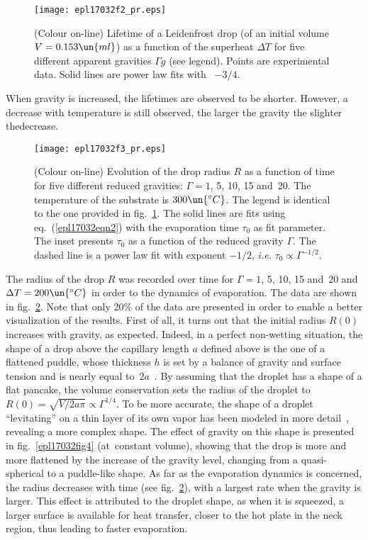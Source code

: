 \documentclass[doublecol,final]{epl2}
\begin{document}
\begin{figure}%
\centering
\texttt{[image: epl17032f2\_pr.eps]}
\caption{(Colour on-line) Lifetime of a Leidenfrost drop (of an initial volume $V=0.153\un{ml}$) as a function of the superheat $\Delta T$ for five different apparent gravities $\Gamma g$ (see legend). Points are experimental data. Solid lines are power law fits with ~$-3/4$.} \label{epl17032fig2}
\end{figure}

When gravity is increased, the lifetimes are observed to be shorter. However, a decrease with temperature is still observed, the larger the gravity the slighter the\break decrease.

\begin{figure}%
\centering
\texttt{[image: epl17032f3\_pr.eps]}
\caption{(Colour on-line) Evolution of the drop radius $R$ as a function of time for five different reduced gravities: $\Gamma=1$, 5, 10, 15 and~20. The temperature of the substrate is $300\un{^\circ C}$. The legend is identical to the one provided in fig.~\ref{epl17032fig2}. The solid lines are fits using eq.~(\ref{epl17032eqn2}) with the evaporation time $\tau_{0}$ as fit parameter. The inset presents $\tau_{0}$ as a function of the reduced gravity $\Gamma$. The dashed line is a power law fit with exponent $-1/2$, \textit{i.e.} $\tau_0 \propto \Gamma^{-1/2}$.} \label{epl17032fig3}
\end{figure}

The radius of the drop $R$ was recorded over time for $\Gamma=1$, 5, 10, 15 and~20 and $\Delta T=200\un{^\circ C}$ in order to  the dynamics of evaporation. The data are shown in fig.~\ref{epl17032fig3}. Note that only 20{\%} of the data are presented in order to enable a better visualization of the results. First of all, it turns out that the initial radius $R(0)$ increases with gravity, as expected. Indeed, in a perfect non-wetting situation, the shape of a drop above the capillary length $a$ defined above is the one of a flattened puddle, whose thickness $h$ is set by a balance of gravity and surface tension and is nearly equal to~$2a$~\cite{epl17032bib26}. By assuming that the droplet has a shape of a flat pancake, the volume conservation sets the radius of the droplet to $R(0)=\sqrt{V/2 a \pi} \propto \Gamma^{1/4}$. To be more accurate, the shape of a droplet ``levitating'' on a thin layer of its own vapor has been modeled in more detail~\cite{epl17032bib8}, revealing a more complex shape. The effect of gravity on this shape is presented in fig.~\ref{epl17032fig4} (at~constant volume), showing that the drop is more and more flattened by the increase of the gravity level, changing from a quasi-spherical to a puddle-like shape. As far as the evaporation dynamics is concerned, the radius decreases with time (see fig.~\ref{epl17032fig3}), with a largest rate when the gravity is larger. This effect is attributed to the droplet shape, as when it is squeezed, a larger surface is available for heat transfer, closer to the hot plate in the neck region, thus leading to faster evaporation.
\end{document}
